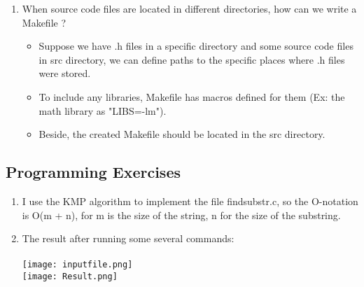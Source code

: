 \documentclass[a4paper]{article}
\begin{document}
\begin{enumerate}
    \item When source code files are located in different directories, how can we write a Makefile ?
    \begin{itemize}
        \item Suppose we have .h files in a specific directory and some source code files in src directory, we can define paths to the specific places where .h files were stored.
        \item To include any libraries, Makefile has macros defined for them (Ex: the math library as "LIBS=-lm").
        \item Beside, the created Makefile should be located in the src directory.
    \end{itemize}
\end{enumerate}

\subsection{Programming Exercises}
\begin{enumerate}
    \item I use the KMP algorithm to implement the file findsubstr.c, so the O-notation is O(m + n), for m is the size of the string, n for the size of the substring. \\
    
    \item The result after running some several commands: \\
    \\
    \texttt{[image: inputfile.png]}
    \\
    \bigbreak
    \texttt{[image: Result.png]}
    \bigbreak
\end{enumerate}
\end{document}
